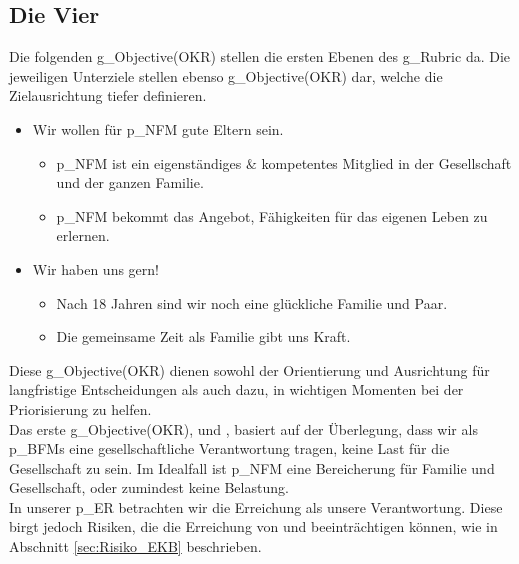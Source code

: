 \subsection{Die Vier}

Die folgenden \gls{g_Objective(OKR)} stellen die ersten Ebenen des \gls{g_Rubric} da. Die jeweiligen Unterziele stellen ebenso \gls{g_Objective(OKR)} dar, welche die Zielausrichtung tiefer definieren.

\begin{itemize}
	\item Wir wollen für \gls{p_NFM} gute Eltern sein.
	\begin{itemize}
	\item \gls{p_NFM} ist ein eigenständiges $\&$ kompetentes Mitglied in der Gesellschaft und der ganzen Familie. \label{NFM_O_1}
	\item \gls{p_NFM} bekommt das Angebot, Fähigkeiten für das eigenen Leben zu erlernen. \label{NFM_O_2}
	\end{itemize}
	\item Wir haben uns gern!
	\begin{itemize}
	\item Nach 18 Jahren sind wir noch eine glückliche Familie und Paar.\label{NFM_O_4}
 	\item Die gemeinsame Zeit als Familie gibt uns Kraft. \label{NFM_O_3}
	\end{itemize}
\end{itemize}


Diese \gls{g_Objective(OKR)} dienen sowohl der Orientierung und Ausrichtung für langfristige Entscheidungen als auch dazu, in wichtigen Momenten bei der Priorisierung zu helfen.\\


Das erste \gls{g_Objective(OKR)}, \NFMOOne und \NFMOTwo, basiert auf der Überlegung, dass wir als \glspl{p_BFM} eine gesellschaftliche Verantwortung tragen, keine Last für die Gesellschaft zu sein. Im Idealfall ist \gls{p_NFM} eine Bereicherung für Familie und Gesellschaft, oder zumindest keine Belastung.\\


In unserer \gls{p_ER} betrachten wir die Erreichung als unsere Verantwortung. Diese birgt jedoch Risiken, die die Erreichung von \NFMOTwo und \NFMOThree beeinträchtigen können, wie in Abschnitt \ref{sec:Risiko_EKB} beschrieben.\\


